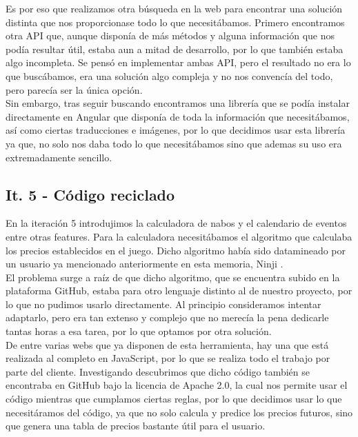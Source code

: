 Es por eso que realizamos otra búsqueda en la web para encontrar una solución distinta que nos proporcionase todo lo que necesitábamos. Primero encontramos otra API \cite{nookipediaapi} que, aunque disponía de más métodos y alguna información que nos podía resultar útil, estaba aun a mitad de desarrollo, por lo que también estaba algo incompleta. Se pensó en implementar ambas API, pero el resultado no era lo que buscábamos, era una solución algo compleja y no nos convencía del todo, pero parecía ser la única opción.\\

Sin embargo, tras seguir buscando encontramos una librería \cite{acnhnpm} que se podía instalar directamente en Angular que disponía de toda la información que necesitábamos, así como ciertas traducciones e imágenes, por lo que decidimos usar esta librería ya que, no solo nos daba todo lo que necesitábamos sino que ademas su uso era extremadamente sencillo. 

\subsection{It. 5 - Código reciclado}

En la iteración 5 introdujimos la calculadora de nabos y el calendario de eventos entre otras features. Para la calculadora necesitábamos el algoritmo que calculaba los precios establecidos en el juego. Dicho algoritmo había sido datamineado por un usuario ya mencionado anteriormente en esta memoria, Ninji \cite{nabosninji}.\\

El problema surge a raíz de que dicho algoritmo, que se encuentra subido en la plataforma GitHub, estaba para otro lenguaje distinto al de nuestro proyecto, por lo que no pudimos usarlo directamente. Al principio consideramos intentar adaptarlo, pero era tan extenso y complejo que no merecía la pena dedicarle tantas horas a esa tarea, por lo que optamos por otra solución.\\

De entre varias webs que ya disponen de esta herramienta, hay una \cite{turnipprophet} que está realizada al completo en JavaScript, por lo que se realiza todo el trabajo por parte del cliente. Investigando descubrimos que dicho código también se encontraba en GitHub bajo la licencia de Apache 2.0, la cual nos permite usar el código mientras que cumplamos ciertas reglas, por lo que decidimos usar lo que necesitáramos del código, ya que no solo calcula y predice los precios futuros, sino que genera una tabla de precios bastante útil para el usuario.\\

